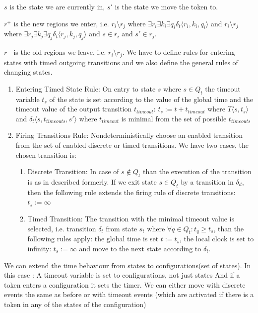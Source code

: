 			$s$ is the state we are currently in, $s'$ is the state we move the token to.
			
			$r^+$ is the new regions we enter, i.e. $ r_i \setminus r_j $ where $ \exists r_i \exists k_i \exists q_i \delta_t\langle r_i,k_i,q_i \rangle$ and $ r_i \setminus r_j $ where $ \exists r_j \exists k_j \exists q_j \delta_t\langle r_j,k_j,q_j \rangle$ and $ s \in r_i$ and $s' \in r_j$.
			
			$r^-$ is the old regions we leave, i.e. $ r_i \setminus r_j $.
			We have to define rules for entering states with timed outgoing transitions and we also define the general rules of changing states. 
			\begin{enumerate}
				\item Entering Timed State Rule: On entry to state $s$ where $s \in Q_t$ the timeout variable $t_s$ of the state is set according to the value of the global time and the timeout value of the output transition $t_{timeout}$:
					$t_s:= t+t_{timeout}$ %
					where $T\langle s,t_s \rangle$ and $\delta_t\langle s,t_{timeouts},s' \rangle$ where $t_{timeout}$ is minimal from the set of possible $t_{timeouts}$ 
				
				\item Firing Transitions Rule: Nondeterministically choose an enabled transition from the set of enabled discrete or timed transitions. We have two cases, the chosen transition is:
					\begin{enumerate}
						\item Discrete Transition: In case of $s \notin Q_t$ than the execution of the transition is as in described formerly. If we exit state $s \in Q_t$ by a transition in $\delta_d$, 
						then the following rule extends the firing rule of discrete transitions:
							$t_s := \infty$
						\item Timed Transition: The transition with the minimal timeout value is selected, i.e. transition $\delta_t$ from state $s_t$ where $\forall q \in Q_t: t_q \geq t_s$, than the following rules apply:
						 the global time is set $t := t_s$, the local clock is set to infinity: $t_s := \infty$ and move to the next state according to $\delta_t$.
					\end{enumerate}			
			\end{enumerate}
			
			We can extend the time behaviour from states to configurations(set of states). %
			In this case :
				A timeout variable is set to configurations, not just states
				And if a token enters a configuration it sets the timer.
				We can either move with 
					discrete events the same as before
					or with timeout events (which are activated if there is a token in any of the states of the configuration)
				
